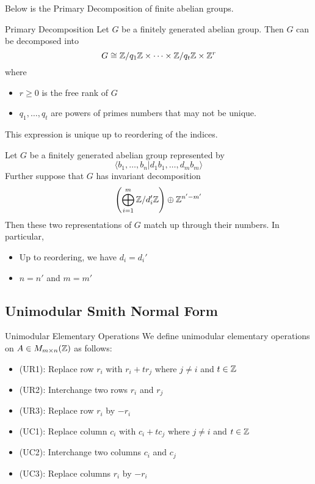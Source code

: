 \documentclass[a4paper]{article}
\begin{document}
Below is the Primary Decomposition of finite abelian groups. 

\begin{thm}{Primary Decomposition}{} Let $G$ be a finitely generated abelian group. Then $G$ can be decomposed into $$G\cong\mathbb{Z}/q_1\mathbb{Z}\times\cdots\times\mathbb{Z}/q_t\mathbb{Z}\times\mathbb{Z}^r$$ where 
\begin{itemize}
\item $r\geq 0$ is the free rank of $G$
\item $q_1,\dots,q_t$ are powers of primes numbers that may not be unique. 
\end{itemize}
This expression is unique up to reordering of the indices. 
\end{thm}

\begin{thm}{}{} Let $G$ be a finitely generated abelian group represented by $$\langle b_1,\dots,b_n|d_1b_1,\dots,d_mb_m\rangle$$ Further suppose that $G$ has invariant decomposition $$\left(\bigoplus_{i=1}^m\mathbb{Z}/d_i'\mathbb{Z}\right)\oplus\mathbb{Z}^{n'-m'}$$ Then these two representations of $G$ match up through their numbers. In particular, 
\begin{itemize}
\item Up to reordering, we have $d_i=d_i'$
\item $n=n'$ and $m=m'$
\end{itemize}
\end{thm}

\subsection{Unimodular Smith Normal Form}
\begin{defn}{Unimodular Elementary Operations}{} We define unimodular elementary operations on $A\in M_{m\times n}(\mathbb{Z})$ as follows: 
\begin{itemize}
\item (UR1): Replace row $r_i$ with $r_i+tr_j$ where $j\neq i$ and $t\in\mathbb{Z}$
\item (UR2): Interchange two rows $r_i$ and $r_j$
\item (UR3): Replace row $r_i$ by $-r_i$
\item (UC1): Replace column $c_i$ with $c_i+tc_j$ where $j\neq i$ and $t\in\mathbb{Z}$
\item (UC2): Interchange two columns $c_i$ and $c_j$
\item (UC3): Replace columns $r_i$ by $-r_i$
\end{itemize}
\end{defn}
\end{document}
